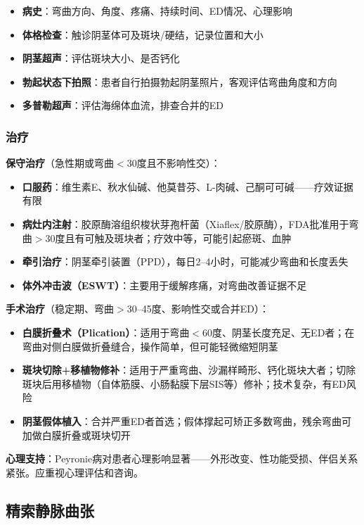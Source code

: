 \begin{itemize}[leftmargin=2cm]
	\item \textbf{病史}：弯曲方向、角度、疼痛、持续时间、ED情况、心理影响
	\item \textbf{体格检查}：触诊阴茎体可及斑块/硬结，记录位置和大小
	\item \textbf{阴茎超声}：评估斑块大小、是否钙化
	\item \textbf{勃起状态下拍照}：患者自行拍摄勃起阴茎照片，客观评估弯曲角度和方向
	\item \textbf{多普勒超声}：评估海绵体血流，排查合并的ED
\end{itemize}

\subsubsection{治疗}

\textbf{保守治疗}（急性期或弯曲$<$30度且不影响性交）：
\begin{itemize}[leftmargin=2cm]
	\item \textbf{口服药}：维生素E、秋水仙碱、他莫昔芬、L-肉碱、己酮可可碱——疗效证据有限
	\item \textbf{病灶内注射}：胶原酶溶组织梭状芽孢杆菌（Xiaflex/胶原酶），FDA批准用于弯曲$>$30度且有可触及斑块者；疗效中等，可能引起瘀斑、血肿
	\item \textbf{牵引治疗}：阴茎牵引装置（PPD），每日2--4小时，可能减少弯曲和长度丢失
	\item \textbf{体外冲击波（ESWT）}：主要用于缓解疼痛，对弯曲改善证据不足
\end{itemize}

\textbf{手术治疗}（稳定期、弯曲$>$30--45度、影响性交或合并ED）：
\begin{itemize}[leftmargin=2cm]
	\item \textbf{白膜折叠术（Plication）}：适用于弯曲$<$60度、阴茎长度充足、无ED者；在弯曲对侧白膜做折叠缝合，操作简单，但可能轻微缩短阴茎
	\item \textbf{斑块切除+移植物修补}：适用于严重弯曲、沙漏样畸形、钙化斑块大者；切除斑块后用移植物（自体筋膜、小肠黏膜下层SIS等）修补；技术复杂，有ED风险
	\item \textbf{阴茎假体植入}：合并严重ED者首选；假体撑起可矫正多数弯曲，残余弯曲可加做白膜折叠或斑块切开
\end{itemize}

\textbf{心理支持}：Peyronie病对患者心理影响显著——外形改变、性功能受损、伴侣关系紧张。应重视心理评估和咨询。

\subsection{精索静脉曲张}
\label{subsec:varicocele}

